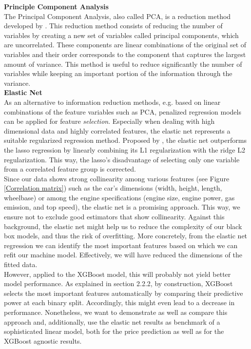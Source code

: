 \documentclass[12pt]{article}
\begin{document}
\noindent \textbf{Principle Component Analysis} \\
The Principal Component Analysis, also called PCA, is a reduction method developed by \cite{Pearson1901}. This reduction method consists of reducing the number of variables by creating a new set of variables called principal components, which are uncorrelated. These components are linear combinations of the original set of variables and their order corresponds to the component that captures the largest amount of variance. 
This method is useful to reduce significantly the number of variables while keeping an important portion of the information through the variance.\\


\noindent \textbf{Elastic Net}\\
\noindent As an alternative to information reduction methods, e.g. based on linear combinations of the feature variables such as PCA, penalized regression models can be applied for feature \textit{selection}. Especially when dealing with high dimensional data and highly correlated features, the elastic net represents a suitable regularized regression method. Proposed by \cite{Zou2005}, the elastic net outperforms the lasso regression by linearly combining its L1 regularization with the ridge L2 regularization. This way, the lasso's disadvantage of selecting only one variable from a correlated feature group is corrected.\\

\noindent Since our data shows strong collinearity among various features (see Figure \ref{Correlation matrix}) such as the car's dimensions (width, height, length, wheelbase) or among the engine specifications (engine size, engine power, gas emission, and top speed), the elastic net is a promising approach. This way, we ensure not to exclude good estimators that show collinearity. Against this background, the elastic net might help us to reduce the complexity of our black box models, and thus the risk of overfitting. More concretely, from the elastic net regression we can identify the most important features based on which we can refit our machine model. Effectively, we will have reduced the dimensions of the fitted data. \\

\noindent However, applied to the XGBoost model, this will probably not yield better model performance. As explained in section 2.2.2, by construction, XGBoost selects the most important features automatically by comparing their predictive power at each binary split. Accordingly, this might even lead to a decrease in performance. Nonetheless, we want to demonstrate as well as compare this approach and, additionally, use the elastic net results as benchmark of a sophisticated linear model, both for the price prediction as well as for the XGBoost agnostic results.\\
\end{document}
